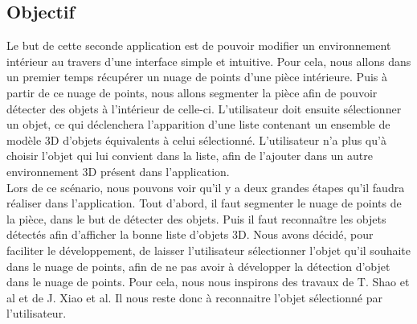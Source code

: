 
\subsection{Objectif}
Le but de cette seconde application est de pouvoir modifier un environnement intérieur au travers d'une interface
simple et intuitive. 
Pour cela, nous allons dans un premier temps récupérer un nuage de points d'une pièce intérieure. Puis à partir
de ce nuage de points, nous allons segmenter la pièce afin de pouvoir détecter des objets à l'intérieur de celle-ci.
L'utilisateur doit ensuite sélectionner un objet, ce qui déclenchera l'apparition d'une liste contenant un ensemble de modèle 3D
d'objets équivalents à celui sélectionné. L'utilisateur n'a plus qu'à choisir l'objet qui lui convient dans la liste,
afin de l'ajouter dans un autre environnement 3D présent dans l'application.\\

Lors de ce scénario, nous pouvons voir qu'il y a deux grandes étapes qu'il faudra réaliser dans l'application. Tout d'abord, il faut 
segmenter le nuage de points de la pièce, dans le but de détecter des objets. Puis il faut reconnaître les objets détectés afin
d'afficher la bonne liste d'objets 3D. Nous avons décidé, pour faciliter le développement, de laisser l'utilisateur sélectionner
l'objet qu'il souhaite dans le nuage de points, afin de ne pas avoir à développer la détection d'objet dans le nuage de points.
Pour cela, nous nous inspirons des travaux de T. Shao et al\cite{interactiveSeg} et de J. Xiao et al\cite{interactionSeg2}.
Il nous reste donc à reconnaitre l'objet sélectionné par l'utilisateur.

